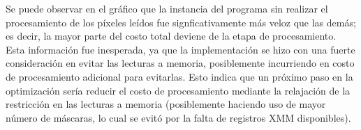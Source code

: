 Se puede observar en el gráfico que la instancia del programa sin realizar el procesamiento de los píxeles leídos fue signficativamente más veloz que las demás; es decir, la mayor parte del costo total deviene de la etapa de procesamiento. Esta información fue inesperada, ya que la implementación se hizo con una fuerte consideración en evitar las lecturas a memoria, posiblemente incurriendo en costo de procesamiento adicional para evitarlas. Esto indica que un próximo paso en la optimización sería reducir el costo de procesamiento mediante la relajación de la restricción en las lecturas a memoria (posiblemente haciendo uso de mayor número de máscaras, lo cual se evitó por la falta de registros XMM disponibles).
